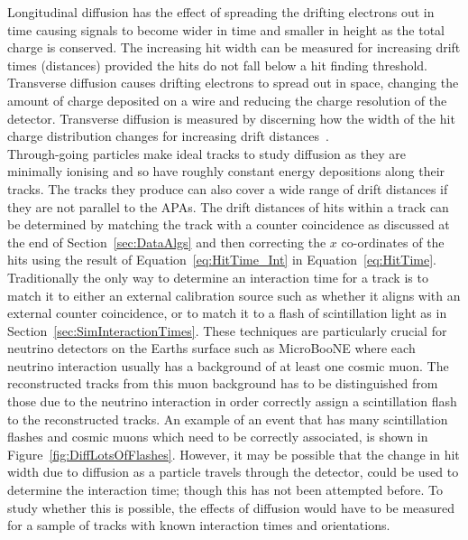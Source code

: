 Longitudinal diffusion has the effect of spreading the drifting electrons out in time causing signals to become wider in time and smaller in height as the total charge is conserved. The increasing hit width can be measured for increasing drift times (distances) provided the hits do not fall below a hit finding threshold. Transverse diffusion causes drifting electrons to spread out in space, changing the amount of charge deposited on a wire and reducing the charge resolution of the detector. Transverse diffusion is measured by discerning how the width of the hit charge distribution changes for increasing drift distances~\citep{Li:2015rqa}. \\

Through-going particles make ideal tracks to study diffusion as they are minimally ionising and so have roughly constant energy depositions along their tracks. The tracks they produce can also cover a wide range of drift distances if they are not parallel to the APAs. The drift distances of hits within a track can be determined by matching the track with a counter coincidence as discussed at the end of Section~\ref{sec:DataAlgs} and then correcting the $x$ co-ordinates of the hits using the result of Equation~\ref{eq:HitTime_Int} in Equation~\ref{eq:HitTime}. \\

Traditionally the only way to determine an interaction time for a track is to match it to either an external calibration source such as whether it aligns with an external counter coincidence, or to match it to a flash of scintillation light as in Section~\ref{sec:SimInteractionTimes}. These techniques are particularly crucial for neutrino detectors on the Earths surface such as MicroBooNE where each neutrino interaction usually has a background of at least one cosmic muon. The reconstructed tracks from this muon background has to be distinguished from those due to the neutrino interaction in order correctly assign a scintillation flash to the reconstructed tracks. An example of an event that has many scintillation flashes and cosmic muons which need to be correctly associated, is shown in Figure~\ref{fig:DiffLotsOfFlashes}. However, it may be possible that the change in hit width due to diffusion as a particle travels through the detector, could be used to determine the interaction time; though this has not been attempted before. To study whether this is possible, the effects of diffusion would have to be measured for a sample of tracks with known interaction times and orientations. \\

